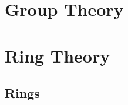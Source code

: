 \documentclass[11pt,a4paper,twoside,openany]{book}
\begin{document}
\frontmatter
\makenotestitle
\tableofcontents

\mainmatter

\part{Group Theory}

















\part{Ring Theory}

\chapter{Rings}
\end{document}
